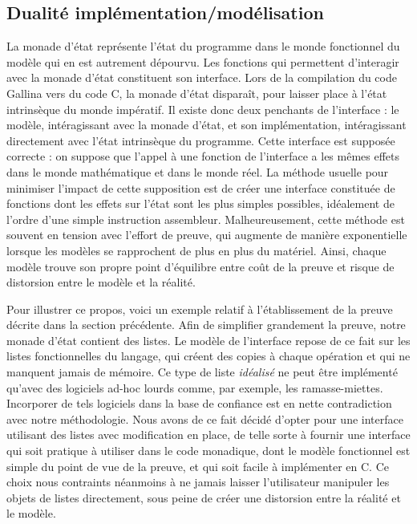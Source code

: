 		\subsection{Dualité implémentation/modélisation}
		\label{sec:model_distortion}
			La monade d'état représente l'état du programme dans le monde fonctionnel du modèle qui en est autrement dépourvu. Les fonctions qui permettent d'interagir avec la monade d'état constituent son interface. Lors de la compilation du code Gallina vers du code C, la monade d'état disparaît, pour laisser place à l'état intrinsèque du monde impératif.
			Il existe donc deux penchants de l'interface : le modèle, intéragissant avec la monade d'état, et son implémentation, intéragissant directement avec l'état intrinsèque du programme. Cette interface est supposée correcte : on suppose que l'appel à une fonction de l'interface a les mêmes effets dans le monde mathématique et dans le monde réel. La méthode usuelle pour minimiser l'impact de cette supposition est de créer une interface constituée de fonctions dont les effets sur l'état sont les plus simples possibles, idéalement de l'ordre d'une simple instruction assembleur.
			Malheureusement, cette méthode est souvent en tension avec l'effort de preuve, qui augmente de manière exponentielle lorsque les modèles se rapprochent de plus en plus du matériel. Ainsi, chaque modèle trouve son propre point d'équilibre entre coût de la preuve et risque de distorsion entre le modèle et la réalité.

			Pour illustrer ce propos, voici un exemple relatif à l'établissement de la preuve décrite dans la section précédente. Afin de simplifier grandement la preuve, notre monade d'état contient des listes. Le modèle de l'interface repose de ce fait sur les listes fonctionnelles du langage, qui créent des copies à chaque opération et qui ne manquent jamais de mémoire. Ce type de liste \emph{idéalisé} ne peut être implémenté qu'avec des logiciels ad-hoc lourds comme, par exemple, les ramasse-miettes. Incorporer de tels logiciels dans la base de confiance est en nette contradiction avec notre méthodologie.
			Nous avons de ce fait décidé d'opter pour une interface utilisant des listes avec modification en place, de telle sorte à fournir une interface qui soit pratique à utiliser dans le code monadique, dont le modèle fonctionnel est simple du point de vue de la preuve, et qui soit facile à implémenter en C. Ce choix nous contraints néanmoins à ne jamais laisser l'utilisateur manipuler les objets de listes directement, sous peine de créer une distorsion entre la réalité et le modèle.

